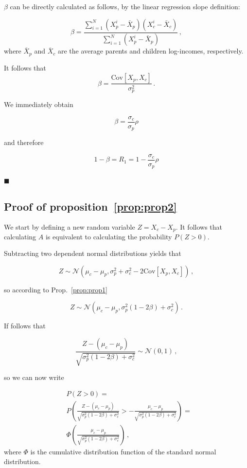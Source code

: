 \documentclass[12pt]{article}
\newcommand*{\qed}{\hfill\ensuremath{\blacksquare}}%
\newcommand{\pref}[1]{Prop.~\ref{prop:#1}}
\newcommand{\preflong}[1]{proposition~\ref{prop:#1}}
\newcommand{\be}{\begin{equation}}
\newcommand{\ee}{\end{equation}}
\numberwithin{equation}{section}
\begin{document}
$\beta$ can be directly calculated as follows, by the linear regression slope definition:

\be
\beta = \frac{\sum_{i=1}^{N} {\left(X_p^i - \bar{X}_p\right)\left(X_c^i - \bar{X}_c\right)}}{\sum_{i=1}^{N} {\left(X_p^i - \bar{X}_p\right)}}\,,
\ee
where $\bar{X}_p$ and $\bar{X}_c$ are the average parents and children log-incomes, respectively.

It follows that 
\be
\beta = \frac{\text{Cov}\left[X_p,X_c\right]}{\sigma_p^2}\,.
\ee

We immediately obtain

\be
\beta = \frac{\sigma_c}{\sigma_p}\rho
\ee

and therefore

\be
1-\beta = R_1 = 1-\frac{\sigma_c}{\sigma_p}\rho
\ee

\qed

\subsection{Proof of \preflong{prop2}}

We start by defining a new random variable $Z = X_c-X_p$. It follows that calculating $A$ is equivalent to calculating the probability $P\left(Z>0\right)$.

Subtracting two dependent normal distributions yields that

\be
Z \sim \mathcal{N}\left(\mu_c - \mu_p,\sigma_p^2 + \sigma_c^2 - 2\text{Cov}\left[X_p,X_c\right]\right)\,,
\ee

so according to \pref{prop1}

\be
Z \sim \mathcal{N}\left(\mu_c - \mu_p,\sigma_p^2\left(1-2\beta\right) + \sigma_c^2\right)\,.
\ee

If follows that

\be
\frac{Z - \left(\mu_c - \mu_p\right)}{\sqrt{\sigma_p^2\left(1-2\beta\right) + \sigma_c^2}} \sim \mathcal{N}\left(0,1\right)\,,
\ee

so we can now write

\be
\begin{split}
&P\left(Z>0\right) = \\ & P\left(\frac{Z - (\mu_c - \mu_p)}{\sqrt{\sigma_p^2\left(1-2\beta\right) + \sigma_c^2}} > -\frac{\mu_c - \mu_p}{\sqrt{\sigma_p^2\left(1-2\beta\right) + \sigma_c^2}} \right) = \\ &\Phi\left(\frac{\mu_c - \mu_p}{\sqrt{\sigma_p^2\left(1 - 2\beta\right) + \sigma_c^2}}\right) \,,
\end{split}
\ee
where $\Phi$ is the cumulative distribution function of the standard normal distribution.
\end{document}
